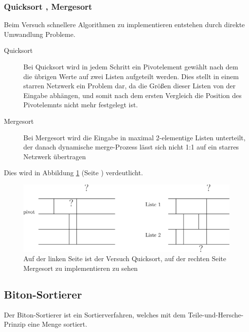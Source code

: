 \documentclass[11pt,ngerman]{article}
\begin{document}
\subsubsection{Quicksort , Mergesort}
Beim Versuch schnellere Algorithmen zu implementieren entstehen durch direkte Umwandlung Probleme. 
\begin{description}
\item[Quicksort] Bei Quicksort wird in jedem Schritt ein Pivotelement gewählt nach dem die übrigen Werte auf zwei Listen aufgeteilt werden. Dies stellt in einem starren Netzwerk ein Problem dar, da die Größen dieser Listen von der Eingabe abhängen, und somit nach dem ersten Vergleich die Position des Pivotelemnts nicht mehr festgelegt ist. 
\item[Mergesort] Bei Mergesort wird die Eingabe in maximal 2-elementige Listen unterteilt, der danach dynamische merge-Prozess lässt sich nicht 1:1 auf ein starres Netzwerk übertragen
\end{description}
Dies wird in Abbildung \ref{fig:mergesort} (Seite \pageref{fig:mergesort}) verdeutlicht.
\begin{figure}
\begin{center}
\includegraphics[scale=0.8]{mergesort.eps}
\end{center}
\caption{Auf der linken Seite ist der Versuch Quicksort, auf der rechten Seite Mergesort zu implementieren zu sehen}
\label{fig:mergesort}
\end{figure}
\subsection{Biton-Sortierer}
Der Biton-Sortierer ist ein Sortierverfahren, welches mit dem Teile-und-Hersche-Prinzip eine Menge sortiert.
\end{document}
